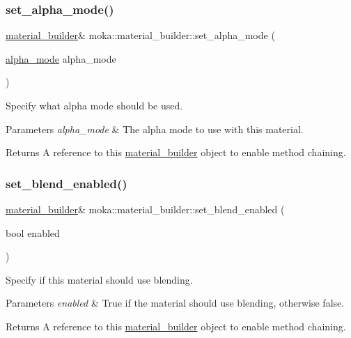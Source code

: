 \subsubsection{\texorpdfstring{set\_alpha\_mode()}{set\_alpha\_mode()}}
{\footnotesize\ttfamily \mbox{\hyperlink{classmoka_1_1material__builder}{material\+\_\+builder}}\& moka\+::material\+\_\+builder\+::set\+\_\+alpha\+\_\+mode (\begin{DoxyParamCaption}\item[{\mbox{\hyperlink{namespacemoka_ad3e7f1428e786c2e7780186b8c0b0d81}{alpha\+\_\+mode}}}]{alpha\+\_\+mode }\end{DoxyParamCaption})}



Specify what alpha mode should be used. 


\begin{DoxyParams}{Parameters}
{\em alpha\+\_\+mode} & The alpha mode to use with this material. \\
\hline
\end{DoxyParams}
\begin{DoxyReturn}{Returns}
A reference to this \mbox{\hyperlink{classmoka_1_1material__builder}{material\+\_\+builder}} object to enable method chaining. 
\end{DoxyReturn}
\mbox{\label{classmoka_1_1material__builder_a7a4c778d83008009bdb77e3b7306b8c1}} 
\subsubsection{\texorpdfstring{set\_blend\_enabled()}{set\_blend\_enabled()}}
{\footnotesize\ttfamily \mbox{\hyperlink{classmoka_1_1material__builder}{material\+\_\+builder}}\& moka\+::material\+\_\+builder\+::set\+\_\+blend\+\_\+enabled (\begin{DoxyParamCaption}\item[{bool}]{enabled }\end{DoxyParamCaption})}



Specify if this material should use blending. 


\begin{DoxyParams}{Parameters}
{\em enabled} & True if the material should use blending, otherwise false. \\
\hline
\end{DoxyParams}
\begin{DoxyReturn}{Returns}
A reference to this \mbox{\hyperlink{classmoka_1_1material__builder}{material\+\_\+builder}} object to enable method chaining. 
\end{DoxyReturn}
\mbox{\label{classmoka_1_1material__builder_a3e5ed182781eace67b436c3f1b6c068d}} 
